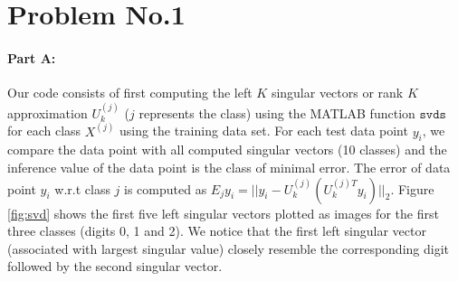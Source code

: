 \section*{Problem No.1} \label{sec:prob1}
\paragraph{Part A:}
Our code consists of first computing the left $K$ singular vectors or rank $K$ approximation $U_{k}^{(j)}$ ($j$ represents the class) using the MATLAB function $\mathtt{svds}$ for each class $X^{(j)}$ using the training data set. For each test data point $y_{i}$, we compare the data point with all computed singular vectors (10 classes) and the inference value of the data point is the class of minimal error. The error of data point $y_{i}$ w.r.t class $j$ is computed as $E_{j}y_{i}=||y_{i}-U_{k}^{(j)}(U_{k}^{(j)T}y_{i}) ||_{2}$. Figure \ref{fig:svd} shows the first five left singular vectors plotted as images for the first three classes (digits 0, 1 and 2). We notice that the first left singular vector (associated with largest singular value) closely resemble the corresponding digit followed by the second singular vector. 


